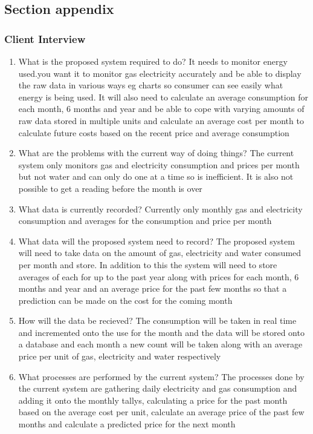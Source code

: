 \subsection{Section appendix}
\subsubsection{Client Interview}
\begin{enumerate}
	\item What is the proposed system required to do?
It needs to monitor energy used.you want it to monitor gas electricity accurately and be able to display the raw data in various ways eg charts so consumer can see easily what energy is being used. It will also need to calculate an average consumption for each month, 6 months and year and be able to cope with varying amounts of raw data stored in multiple units and calculate an average cost per month to calculate future costs based on the recent price and average consumption

	\item What are the problems with the current way of doing things?
The current system only monitors gas and electricity consumption and prices per month but not water and can only do one at a time so is inefficient. It is also not possible to get a reading before the month is over

	\item What data is currently recorded?
Currently only monthly gas and electricity consumption and averages for the consumption and price per month

	\item What data will the proposed system need to record?
The proposed system will need to take data on the amount of gas, electricity and water consumed per month and store. In addition to this the system will need to store averages of each for up to the past year along with prices for each month, 6 months and year and an average price for the past few months so that a prediction can be made on the cost for the coming month

	\item How will the data be recieved?
The consumption will be taken in real time and incremented onto the use for the month and the data will be stored onto a database and each month a new count will be taken along with an average price per unit of gas, electricity and water respectively

	\item What processes are performed by the current system?
The processes done by the current system are gathering daily electricity and gas consumption and adding it onto the monthly tallys, calculating a price for the past month based on the average cost per unit, calculate an average price of the past few months and calculate a predicted price for the next month


\end{enumerate}
